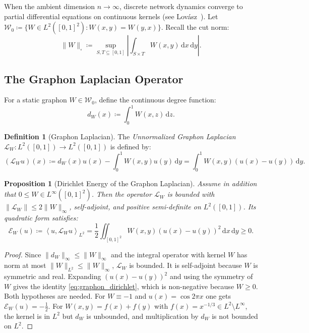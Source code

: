 \documentclass[11pt,a4paper,reqno]{amsart}
\newtheorem{proposition}[theorem]{Proposition}
\theoremstyle{definition}
\newtheorem{definition}[theorem]{Definition}
\numberwithin{equation}{section}
\providecommand{\cutnorm}[1]{\|#1\|_{\square}}
\newcommand{\inner}[2]{\left\langle #1, #2 \right\rangle}
\newcommand{\dif}{\,\mathrm{d}}
\providecommand{\cutnorm}[1]{\|#1\|_{\square}}
\begin{document}
When the ambient dimension $n \to \infty$, discrete network dynamics converge to partial differential equations on continuous kernels (see Lov\'asz~\cite{lovasz2012large}). Let $\mathcal{W}_0 \coloneqq \{W \in L^2([0, 1]^2) \colon W(x, y) = W(y, x)\}$. Recall the cut norm:
\begin{equation}
    \label{eq:cut_norm_def_paper2}
    \cutnorm{W} \coloneqq \sup_{S, T \subseteq [0, 1]} \left| \int_{S \times T} W(x, y) \dif x \dif y \right|.
\end{equation}

\subsection{The Graphon Laplacian Operator}
For a static graphon $W \in \mathcal{W}_0$, define the continuous degree function:
\begin{equation}
    d_W(x) \coloneqq \int_0^1 W(x, z) \dif z.
\end{equation}

\begin{definition}[Graphon Laplacian]
The \emph{Unnormalized Graphon Laplacian} $\mathcal{L}_W \colon L^2([0, 1]) \to L^2([0, 1])$ is defined by:
\begin{equation}
    \label{eq:graphon_laplacian}
    (\mathcal{L}_W u)(x) \coloneqq d_W(x) u(x) - \int_0^1 W(x, y) u(y) \dif y = \int_0^1 W(x, y)(u(x) - u(y)) \dif y.
\end{equation}
\end{definition}

\begin{proposition}[Dirichlet Energy of the Graphon Laplacian]
\label{prop:graphon_dirichlet_energy}
Assume in addition that $0 \le W \in L^\infty([0,1]^2)$. Then the operator $\mathcal{L}_W$ is bounded with $\|\mathcal{L}_W\| \le 2\|W\|_\infty$, self-adjoint, and positive semi-definite on $L^2([0, 1])$. Its quadratic form satisfies:
\begin{equation}
    \label{eq:graphon_dirichlet}
    \mathcal{E}_W(u) \coloneqq \inner{u}{\mathcal{L}_W u}_{L^2} = \frac{1}{2} \iint_{[0,1]^2} W(x, y) (u(x) - u(y))^2 \dif x \dif y \ge 0.
\end{equation}
\end{proposition}
\begin{proof}
Since $\|d_W\|_\infty \le \|W\|_\infty$ and the integral operator with kernel $W$ has norm at most $\|W\|_{L^2} \le \|W\|_\infty$, $\mathcal{L}_W$ is bounded. It is self-adjoint because $W$ is symmetric and real. Expanding $(u(x) - u(y))^2$ and using the symmetry of $W$ gives the identity \eqref{eq:graphon_dirichlet}, which is non-negative because $W \ge 0$. Both hypotheses are needed. For $W \equiv -1$ and $u(x) = \cos 2\pi x$ one gets $\mathcal{E}_W(u) = -\frac12$. For $W(x,y) = f(x) + f(y)$ with $f(x) = x^{-1/3} \in L^2 \setminus L^\infty$, the kernel is in $L^2$ but $d_W$ is unbounded, and multiplication by $d_W$ is not bounded on $L^2$.
\end{proof}
\end{document}
